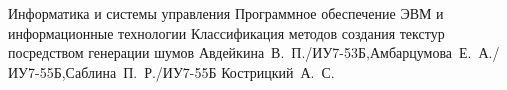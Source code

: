 \makeresearchtitle
{Информатика и системы управления} %
{Программное обеспечение ЭВМ и информационные технологии} %
{Классификация методов создания текстур посредством генерации шумов} %
{Авдейкина~В.~П./ИУ7-53Б,Амбарцумова~Е.~А./ИУ7-55Б,Саблина~П.~Р./ИУ7-55Б} %
{Кострицкий~А.~С.} %
{} %
